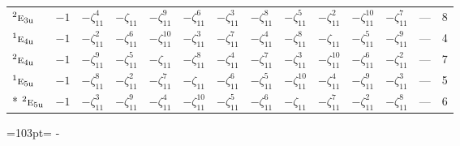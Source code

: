 \documentclass[10pt,a4paper]{article}
\newcommand{\needspace}[1]{\par\penalty-100\begingroup\dimen0=#1\relax\dimen2=\pagegoal
  \advance\dimen2-\pagetotal\ifdim\dimen0>\dimen2\relax\ifdim\dimen2>0pt\vfil\break\fi\fi
  \endgroup}
\numberwithin{equation}{section}
\newcommand{\irr}[1]{\text{\normalfont\scshape #1}}
\newcommand{\conjpair}[1]{{}^{#1}}
\newcommand{\ptag}[1]{\mathrm{#1}}
\newcommand{\rootunity}[1]{\zeta_{#1}}
\begin{document}
{\begin{longtable}{@{}lcccccccccccll@{}}
$\conjpair{2}\irr{e}_{3\ptag{u}}$ & $-1$ & $-\rootunity{11}^{4}$ & $-\rootunity{11}$ & $-\rootunity{11}^{9}$ & $-\rootunity{11}^{6}$ & $-\rootunity{11}^{3}$ & $-\rootunity{11}^{8}$ & $-\rootunity{11}^{5}$ & $-\rootunity{11}^{2}$ & $-\rootunity{11}^{10}$ & $-\rootunity{11}^{7}$ & --- & 8\\
$\conjpair{1}\irr{e}_{4\ptag{u}}$ & $-1$ & $-\rootunity{11}^{2}$ & $-\rootunity{11}^{6}$ & $-\rootunity{11}^{10}$ & $-\rootunity{11}^{3}$ & $-\rootunity{11}^{7}$ & $-\rootunity{11}^{4}$ & $-\rootunity{11}^{8}$ & $-\rootunity{11}$ & $-\rootunity{11}^{5}$ & $-\rootunity{11}^{9}$ & --- & 4\\
$\conjpair{2}\irr{e}_{4\ptag{u}}$ & $-1$ & $-\rootunity{11}^{9}$ & $-\rootunity{11}^{5}$ & $-\rootunity{11}$ & $-\rootunity{11}^{8}$ & $-\rootunity{11}^{4}$ & $-\rootunity{11}^{7}$ & $-\rootunity{11}^{3}$ & $-\rootunity{11}^{10}$ & $-\rootunity{11}^{6}$ & $-\rootunity{11}^{2}$ & --- & 7\\
$\conjpair{1}\irr{e}_{5\ptag{u}}$ & $-1$ & $-\rootunity{11}^{8}$ & $-\rootunity{11}^{2}$ & $-\rootunity{11}^{7}$ & $-\rootunity{11}$ & $-\rootunity{11}^{6}$ & $-\rootunity{11}^{5}$ & $-\rootunity{11}^{10}$ & $-\rootunity{11}^{4}$ & $-\rootunity{11}^{9}$ & $-\rootunity{11}^{3}$ & --- & 5\\*
$\conjpair{2}\irr{e}_{5\ptag{u}}$ & $-1$ & $-\rootunity{11}^{3}$ & $-\rootunity{11}^{9}$ & $-\rootunity{11}^{4}$ & $-\rootunity{11}^{10}$ & $-\rootunity{11}^{5}$ & $-\rootunity{11}^{6}$ & $-\rootunity{11}$ & $-\rootunity{11}^{7}$ & $-\rootunity{11}^{2}$ & $-\rootunity{11}^{8}$ & --- & 6\\
\bottomrule\end{longtable}}
\needspace{103pt}
\end{document}
